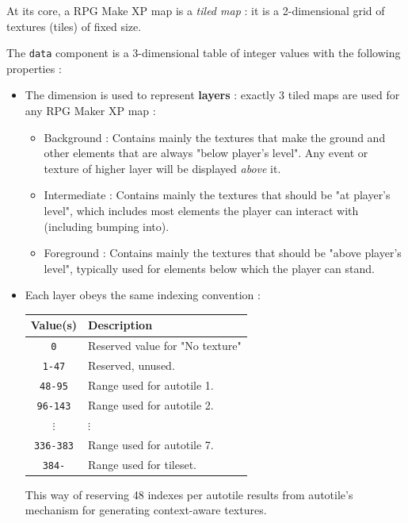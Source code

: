 \documentclass[11pt]{article}
\begin{document}
{At its core, a RPG Make XP map is a \textit{tiled map} : it is a 2-dimensional grid of textures (tiles) of fixed size.

The \verb|data| component is a 3-dimensional table of integer values with the following properties :
\begin{itemize}
	\item The  dimension is used to represent \textbf{layers} : exactly 3 tiled maps are used for any RPG Maker XP map :
	\begin{itemize}
		\item Background : Contains mainly the textures that make the ground and other elements that are always "below player's level". Any event or texture of higher layer will be displayed \textit{above} it.
		
		\item Intermediate : Contains mainly the textures that should be "at player's level", which includes most elements the player can interact with (including bumping into).
		
		\item Foreground : Contains mainly the textures that should be "above player's level", typically used for elements below which the player can stand.
	\end{itemize}
	
	\newpage
	\item Each layer obeys the same indexing convention :
	
	\begin{tabular}{|c|l|}
		\hline
		\rowcolor{mylightgray}
		\textbf{Value(s)} & \textbf{Description} \\
		\hline
		\verb|0| & Reserved value for "No texture" \\
		\hline
		\verb|1-47| & Reserved, unused. \\
		\hline
		\verb|48-95| & Range used for autotile 1. \\
		\hline
		\verb|96-143| & Range used for autotile 2. \\
		\hline
		$\vdots$ & \phantom{hi reader :wink:}$\vdots$ \\
		\hline
		\verb|336-383| & Range used for autotile 7. \\
		\hline
		\verb|384-| & Range used for tileset. \\
		\hline
	\end{tabular}
	
	This way of reserving 48 indexes per autotile results from autotile's mechanism for generating context-aware textures.
	

\end{itemize}}
\end{document}
